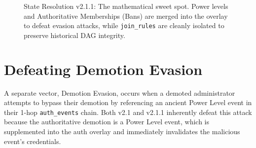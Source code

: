 \documentclass[12pt]{article}
\begin{document}
\begin{figure}[H]
\centering
{}
\caption{State Resolution v2.1.1: The mathematical sweet spot. Power levels and Authoritative Memberships (Bans) are merged into the overlay to defeat evasion attacks, while \texttt{join\_rules} are cleanly isolated to preserve historical DAG integrity.}
\label{fig:v211_merge}
\end{figure}

\section{Defeating Demotion Evasion}
A separate vector, Demotion Evasion, occurs when a demoted administrator attempts to bypass their demotion by referencing an ancient Power Level event in their 1-hop \texttt{auth\_events} chain. Both v2.1 and v2.1.1 inherently defeat this attack because the authoritative demotion is a Power Level event, which is supplemented into the auth overlay and immediately invalidates the malicious event's credentials.
\end{document}
